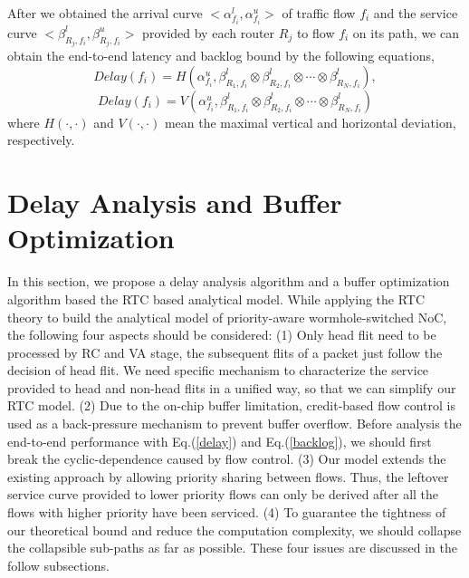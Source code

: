 \documentclass[10pt,journal]{IEEEtran}
\begin{document}
After we obtained the arrival curve $<\alpha^l_{f_i},\alpha^u_{f_i}>$ of traffic flow $f_i$ and the service curve $<\beta_{R_j,f_i}^l,\beta_{R_j,f_i}^u>$ provided by each router $R_j$ to flow $f_i$ on its path, we can obtain the end-to-end latency and backlog bound by the following equations,
\begin{equation}\label{delay}
Delay(f_i)=H(\alpha^u_{f_i},\beta^l_{R_1,f_i}\otimes\beta^l_{R_2,f_i}\otimes\cdots\otimes\beta^l_{R_N,f_i}),
\end{equation}
\begin{equation}\label{backlog}
Delay(f_i)=V(\alpha^u_{f_i},\beta^l_{R_1,f_i}\otimes\beta^l_{R_2,f_i}\otimes\cdots\otimes\beta^l_{R_N,f_i})
\end{equation}
where $H(\cdot,\cdot)$ and $V(\cdot,\cdot)$ mean the maximal vertical and horizontal deviation, respectively.

\section{Delay Analysis and Buffer Optimization}\label{modeling}
In this section, we propose a delay analysis algorithm and a buffer optimization algorithm based the RTC based analytical model. While applying the RTC theory to build the analytical model of priority-aware wormhole-switched NoC, the following four aspects should be considered: (1) Only head flit need to be processed by RC and VA stage, the subsequent flits of a packet just follow the decision of head flit. We need specific mechanism to characterize the service provided to head and non-head flits in a unified way, so that we can simplify our RTC model. (2) Due to the on-chip buffer limitation, credit-based flow control is used as a back-pressure mechanism to prevent buffer overflow. Before analysis the end-to-end performance with Eq.(\ref{delay}) and Eq.(\ref{backlog}), we should first break the cyclic-dependence caused by flow control. (3) Our model extends the existing approach \cite{73}\cite{Qian489900} by allowing priority sharing between flows. Thus, the leftover service curve provided to lower priority flows can only be derived after all the flows with higher priority have been serviced. (4) To guarantee the tightness of our theoretical bound and reduce the computation complexity, we should collapse the collapsible sub-paths as far as possible. These four issues are discussed in the follow subsections.
\end{document}
